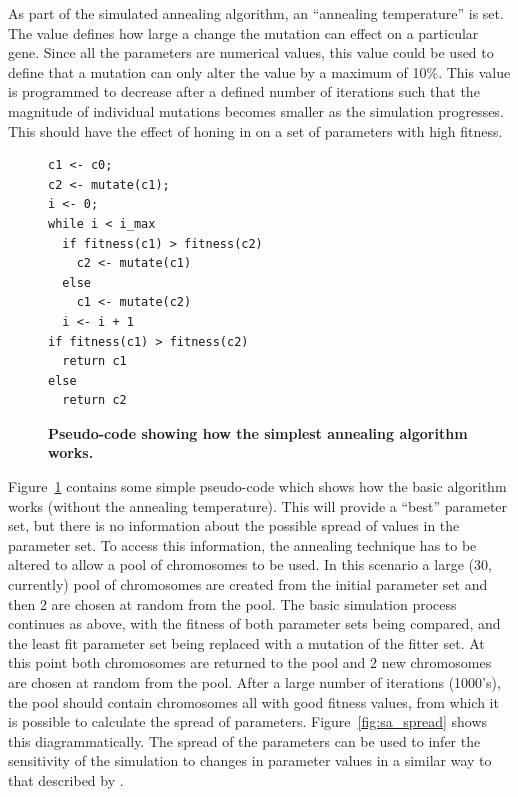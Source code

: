 As part of the simulated annealing algorithm, an ``annealing temperature'' is set. The value defines how large a change the mutation can effect on a particular gene. Since all the parameters are numerical values, this value could be used to define that a mutation can only alter the value by a maximum of 10\%. This value is programmed to decrease after a defined number of iterations such that the magnitude of individual mutations becomes smaller as the simulation progresses. This should have the effect of honing in on a set of parameters with high fitness.

\begin{figure}
\begin{verbatim}
c1 <- c0;
c2 <- mutate(c1);
i <- 0;
while i < i_max
  if fitness(c1) > fitness(c2)
    c2 <- mutate(c1)
  else
    c1 <- mutate(c2)
  i <- i + 1
if fitness(c1) > fitness(c2)
  return c1
else
  return c2
\end{verbatim}
\caption[Pseudo-code showing how the simplest annealing algorithm works.]{{\bf Pseudo-code showing how the simplest annealing algorithm works.}
\label{fig:sa_code}}
\end{figure}

Figure~\ref{fig:sa_code} contains some simple pseudo-code which shows how the basic algorithm works (without the annealing temperature). This will provide a ``best'' parameter set, but there is no information about the possible spread of values in the parameter set. To access this information, the annealing technique has to be altered to allow a pool of chromosomes to be used. In this scenario a large (30, currently) pool of chromosomes are created from the initial parameter set and then 2
are chosen at random from the pool. The basic simulation process continues as above, with the fitness of both parameter sets being compared, and the least fit parameter set being replaced with a mutation of the fitter set. At this point both chromosomes are returned to the pool and 2 new chromosomes are chosen at random from the pool. After a large number of iterations (1000's), the pool should contain chromosomes all with good fitness values, from which it is possible to calculate the spread of parameters. Figure~\ref{fig:sa_spread} shows this diagrammatically. The spread of the parameters can be used to infer the sensitivity of the simulation to changes in parameter values in a similar way to that described by \citet{Toni2009}.

